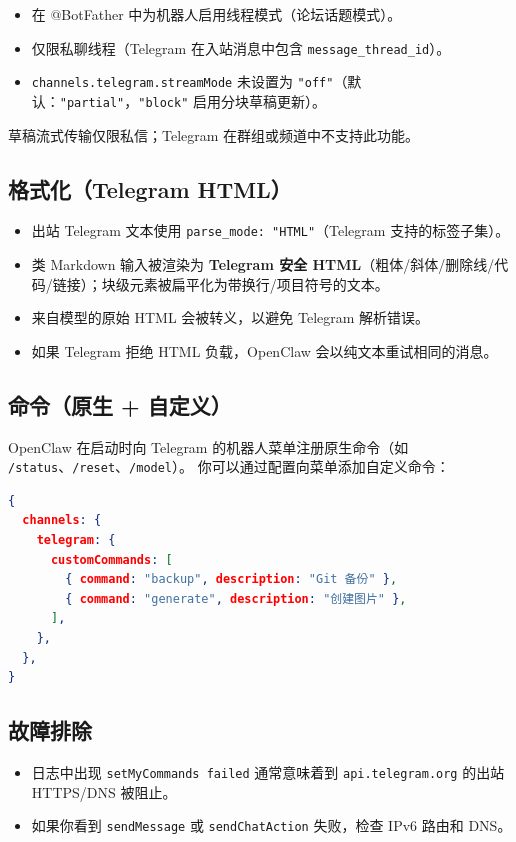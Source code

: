 \begin{itemize}
  \item 在 @BotFather 中为机器人启用线程模式（论坛话题模式）。
  \item 仅限私聊线程（Telegram 在入站消息中包含 \texttt{message\_thread\_id}）。
  \item \texttt{channels.telegram.streamMode} 未设置为 \texttt{"off"}（默认：\texttt{"partial"}，\texttt{"block"} 启用分块草稿更新）。
\end{itemize}


草稿流式传输仅限私信；Telegram 在群组或频道中不支持此功能。

\subsection{格式化（Telegram HTML）}


\begin{itemize}
  \item 出站 Telegram 文本使用 \texttt{parse\_mode: "HTML"}（Telegram 支持的标签子集）。
  \item 类 Markdown 输入被渲染为 \textbf{Telegram 安全 HTML}（粗体/斜体/删除线/代码/链接）；块级元素被扁平化为带换行/项目符号的文本。
  \item 来自模型的原始 HTML 会被转义，以避免 Telegram 解析错误。
  \item 如果 Telegram 拒绝 HTML 负载，OpenClaw 会以纯文本重试相同的消息。
\end{itemize}


\subsection{命令（原生 + 自定义）}


OpenClaw 在启动时向 Telegram 的机器人菜单注册原生命令（如 \texttt{/status}、\texttt{/reset}、\texttt{/model}）。
你可以通过配置向菜单添加自定义命令：

\begin{lstlisting}[language=json]
{
  channels: {
    telegram: {
      customCommands: [
        { command: "backup", description: "Git 备份" },
        { command: "generate", description: "创建图片" },
      ],
    },
  },
}
\end{lstlisting}


\subsection{故障排除}


\begin{itemize}
  \item 日志中出现 \texttt{setMyCommands failed} 通常意味着到 \texttt{api.telegram.org} 的出站 HTTPS/DNS 被阻止。
  \item 如果你看到 \texttt{sendMessage} 或 \texttt{sendChatAction} 失败，检查 IPv6 路由和 DNS。
\end{itemize}


